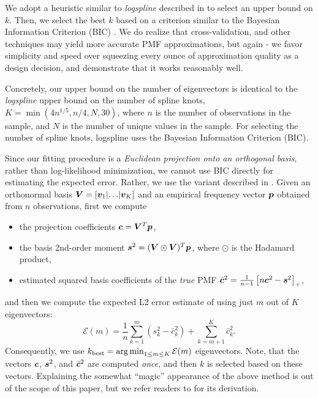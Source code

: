 \documentclass[10pt]{article} %
\begin{document}
We adopt a heuristic similar to \emph{logspline} described in \citet{StoneHansenKooperbergTruong1997} to select an upper bound on $k$. Then, we select the best $k$ based on a criterion similar to the Bayesian Information Criterion (BIC) \citep{schwarz1978estimating}. We do realize that cross-validation, and other techniques may yield more accurate PMF approximations, but again - we favor simplicity and speed over squeezing every ounce of approximation quality as a design decision, and demonstrate that it works reasonably well.

Concretely, our upper bound on the number of eigenvectors is identical to the \emph{logspline} upper bound on the number of spline knots, $K = \min(4 n^{1/5}, n / 4, N, 30)$, where $n$ is the number of observations in the sample, and $N$ is the number of unique values in the sample. For selecting the number of spline knots, logspline uses the Bayesian Information Criterion (BIC). 

Since our fitting procedure is a \emph{Euclidean projection onto an orthogonal basis}, rather than log-likelihood minimization, we cannot use BIC directly for estimating the expected error. Rather, we use the variant described in \citet{diggle_hall_orthogonal_selection}. Given an orthonormal basis ${\bm{V}} = [{\bm{v}}_1 \lvert \dots \rvert {\bm{v}}_K]$ and an empirical frequency vector ${\bm{p}}$ obtained from $n$ observations, first we compute
\begin{itemize}
    \item the projection coefficients ${\bm{c}} = {\bm{V}}^T {\bm{p}}$,
    \item the basis 2nd-order moment ${\bm{s}}^2 = ({\bm{V}} \odot {\bm{V}})^T {\bm{p}}$, where $\odot$ is the Hadamard product,
    \item estimated squared basis coefficients of the \emph{true} PMF $\bar{{\bm{c}}}^2 = \frac{1}{n-1} \left[n {\bm{c}}^2 -  {\bm{s}}^2\right]_+$,
\end{itemize}
and then we compute the expected L2 error estimate of using just $m$ out of $K$ eigenvectors:
\[
\mathcal{E}(m) = \frac{1}{n}\sum_{k=1}^m (s_k^2 - \bar{c}_k^2) + \sum_{k=m+1}^K \bar{c}_k^2.
\]
Consequently, we use $k_{\mathrm{best}} = \operatorname*{arg\,min}_{1 \leq m \leq K} \mathcal{E}(m)$ eigenvectors. Note, that the vectors ${\bm{c}}$, ${\bm{s}}^2$, and $\bar{{\bm{c}}}^2$ are computed \emph{once}, and then $k$ is selected based on these vectors. Explaining the somewhat ``magic'' appearance of the above method is out of the scope of this paper, but we refer readers to \citet{diggle_hall_orthogonal_selection} for its derivation.
\end{document}
